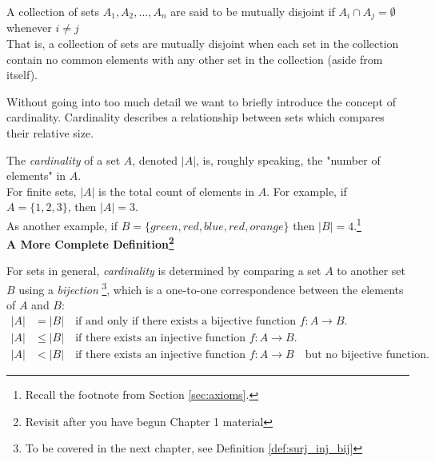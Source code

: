\begin{definition}
    A collection of sets $A_1,A_2,...,A_n$ are said to be mutually disjoint if $A_i\cap A_j=\emptyset$ whenever $i\neq j$ \\

    \noindent That is, a collection of sets are mutually disjoint when each set in the collection contain no common elements with any other set in the collection (aside from itself).
\end{definition}
\newpage
Without going into too much detail we want to briefly introduce the concept of cardinality. Cardinality describes a relationship between sets which compares their relative size.
\begin{definition}
    The \textit{cardinality} of a set \(A\), denoted \(|A|\), is, roughly speaking, the "number of elements" in \(A\). \\

    \noindent For finite sets, \(|A|\) is the total count of elements in \(A\). For example, if \(A = \{1, 2, 3\}\), then \(|A| = 3\). \\
    \noindent As another example, if \(B=\{green, red, blue, red, orange\}\) then $|B|=4$.\footnote{Recall the footnote from Section \ref{sec:axioms}.}\\ 
    
    \noindent \textbf{A More Complete Definition\footnote{Revisit after you have begun Chapter 1 material}} 

    \noindent For sets in general, \textit{cardinality} is determined by comparing a set \(A\) to another set \(B\) using a \textit{bijection} \footnote{To be covered in the next chapter, see Definition \ref{def:surj_inj_bij}}, which is a one-to-one correspondence between the elements of \(A\) and \(B\):
    \begin{align}
        |A| &= |B| \quad \text{if and only if there exists a bijective function } f: A \to B. \nonumber \\
        |A|&\leq |B| \quad \text{if there exists an injective function }f:A \to B. \nonumber \\
        |A|&<|B| \quad \text{if there exists an injective function } f:A \to B \quad \text{but no bijective function.} \nonumber
    \end{align}
\end{definition}

